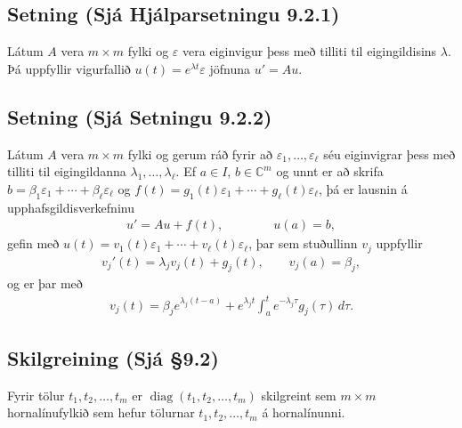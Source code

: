 \documentclass[a4paper,10pt,icelandic]{sphinxmanual}
\begin{document}
\subsection{Setning (Sjá Hjálparsetningu 9.2.1)}
\label{\detokenize{Kafli09:setning-sja-hjalparsetningu-9-2-1}}
Látum \(A\) vera \(m\times m\) fylki og \(\varepsilon\) vera eiginvigur þess með tilliti til eigingildisins \(\lambda\). Þá uppfyllir vigurfallið \(u(t)=e^{\lambda t}\varepsilon\) jöfnuna \(u'=Au\).


\subsection{Setning (Sjá Setningu 9.2.2)}
\label{\detokenize{Kafli09:setning-sja-setningu-9-2-2}}
Látum \(A\) vera \(m\times m\) fylki og gerum ráð fyrir að \(\varepsilon_1,\dots,\varepsilon_\ell\) séu eiginvigrar þess með tilliti til eigingildanna \(\lambda_1,\dots,\lambda_\ell\). Ef \(a \in I\), \(b\in {\mathbb{C}}^m\) og unnt er að skrifa \(b=\beta_1\varepsilon_1+\cdots+\beta_\ell\varepsilon_\ell\) og \(f(t)=g_1(t)\varepsilon_1+\cdots+g_\ell(t)\varepsilon_\ell\), þá er lausnin á upphafsgildisverkefninu
\begin{equation*}
\begin{split}u'=Au+f(t), \qquad \qquad u(a)=b,\end{split}
\end{equation*}
gefin með \(u(t)=v_1(t)\varepsilon_1+\cdots+v_\ell(t)\varepsilon_\ell\), þar sem stuðullinn \(v_j\) uppfyllir
\begin{equation*}
\begin{split}v_j'(t)=\lambda_jv_j(t)+g_j(t), \qquad v_j(a)=\beta_j,\end{split}
\end{equation*}
og er þar með
\begin{equation*}
\begin{split}v_j(t)=\beta_je^{\lambda_j(t-a)}+e^{\lambda_jt}\int_a^t e^{-\lambda_j
\tau}g_j(\tau) \, d\tau.\end{split}
\end{equation*}

\subsection{Skilgreining (Sjá \S{}9.2)}
\label{\detokenize{Kafli09:skilgreining-sja-9-2}}
Fyrir tölur \(t_1, t_2, \ldots, t_m\) er \({\operatorname{diag}}(t_1, t_2, \ldots, t_m)\) skilgreint sem \(m\times m\) hornalínufylkið sem hefur tölurnar \(t_1, t_2, \ldots, t_m\) á hornalínunni.
\end{document}
